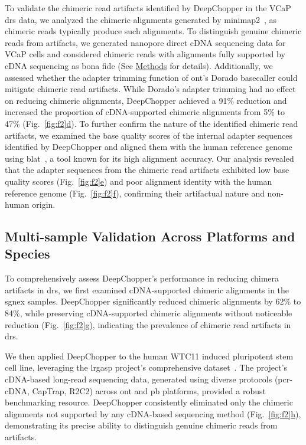 \documentclass[pdflatex,sn-nature, lineno]{sn-jnl}%
\newcommand{\figref}[2]{Fig.~\hyperref[#1]{\ref*{#1}#2}}
\begin{document}
To validate the chimeric read artifacts identified by DeepChopper in the VCaP \gls{drs} data, we analyzed the chimeric alignments generated by minimap2~\cite{li2018minimap2}, as chimeric reads typically produce such alignments.
To distinguish genuine chimeric reads from artifacts, we generated nanopore direct cDNA sequencing data for VCaP cells and considered chimeric reads with alignments fully supported by cDNA sequencing as bona fide (See \hyperref[sec:methods]{Methods} for details).
Additionally, we assessed whether the adapter trimming function of \gls{ont}'s Dorado basecaller could mitigate chimeric read artifacts.
While Dorado's adapter trimming had no effect on reducing chimeric alignments, DeepChopper achieved a 91\% reduction and increased the proportion of cDNA-supported chimeric alignments from 5\% to 47\% (\figref{fig:f2}{d}).
To further confirm the nature of the identified chimeric read artifacts, we examined the base quality scores of the internal adapter sequences identified by DeepChopper and aligned them with the human reference genome using \gls{blat}~\cite{kent2002blat}, a tool known for its high alignment accuracy.
Our analysis revealed that the adapter sequences from the chimeric read artifacts exhibited low base quality scores (\figref{fig:f2}{e}) and poor alignment identity with the human reference genome (\figref{fig:f2}{f}), confirming their artifactual nature and non-human origin.

\subsection{Multi-sample Validation Across Platforms and Species}

To comprehensively assess DeepChopper’s performance in reducing chimera artifacts in \gls{drs}, we first examined cDNA-supported chimeric alignments in the \gls{sgnex} samples.
DeepChopper significantly reduced chimeric alignments by 62\% to 84\%, while preserving cDNA-supported chimeric alignments without noticeable reduction (\figref{fig:f2}{g}), indicating the prevalence of chimeric read artifacts in \gls{drs}.

We then applied DeepChopper to the human WTC11 induced pluripotent stem cell line, leveraging the \gls{lrgasp} project's comprehensive dataset~\cite{pardo2024systematic}.
The project's cDNA-based long-read sequencing data, generated using diverse protocols (\gls{pcr}-cDNA, CapTrap, R2C2) across \gls{ont} and \gls{pb} platforms, provided a robust benchmarking resource. DeepChopper consistently eliminated only the chimeric alignments not supported by any cDNA-based sequencing method (\figref{fig:f2}{h}), demonstrating its precise ability to distinguish genuine chimeric reads from artifacts.
\end{document}
